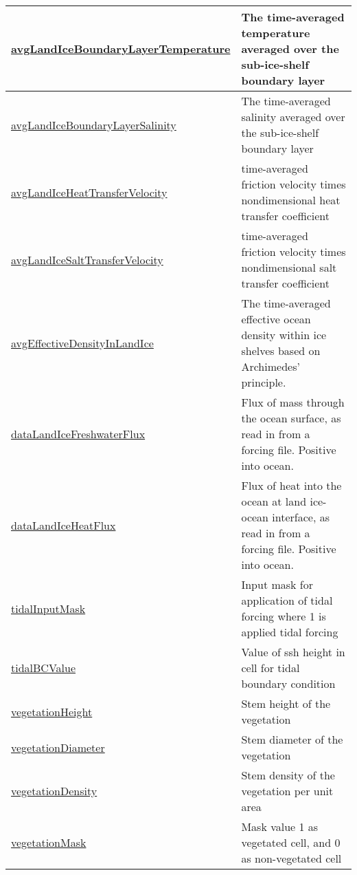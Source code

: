 {\begin{center}
\begin{longtable}{| p{2.0in} | p{4.0in} |}
    \hyperref[subsec:var_sec_forcing_avgLandIceBoundaryLayerTemperature]{avgLandIceBoundaryLayer\-Temperature} & The time-averaged temperature averaged over the sub-ice-shelf boundary layer \\
    \hline
    \hyperref[subsec:var_sec_forcing_avgLandIceBoundaryLayerSalinity]{avgLandIceBoundaryLayer\-Salinity} & The time-averaged salinity averaged over the sub-ice-shelf boundary layer \\
    \hline
    \hyperref[subsec:var_sec_forcing_avgLandIceHeatTransferVelocity]{avgLandIceHeatTransferVelocity} & time-averaged friction velocity times nondimensional heat transfer coefficient \\
    \hline
    \hyperref[subsec:var_sec_forcing_avgLandIceSaltTransferVelocity]{avgLandIceSaltTransferVelocity} & time-averaged friction velocity times nondimensional salt transfer coefficient \\
    \hline
    \hyperref[subsec:var_sec_forcing_avgEffectiveDensityInLandIce]{avgEffectiveDensityInLandIce} & The time-averaged effective ocean density within ice shelves based on Archimedes' principle. \\
    \hline
    \hyperref[subsec:var_sec_forcing_dataLandIceFreshwaterFlux]{dataLandIceFreshwaterFlux} & Flux of mass through the ocean surface, as read in from a forcing file. Positive into ocean. \\
    \hline
    \hyperref[subsec:var_sec_forcing_dataLandIceHeatFlux]{dataLandIceHeatFlux} & Flux of heat into the ocean at land ice-ocean interface, as read in from a forcing file. Positive into ocean. \\
    \hline
    \hyperref[subsec:var_sec_forcing_tidalInputMask]{tidalInputMask} & Input mask for application of tidal forcing where 1 is applied tidal forcing \\
    \hline
    \hyperref[subsec:var_sec_forcing_tidalBCValue]{tidalBCValue} & Value of ssh height in cell for tidal boundary condition \\
    \hline
    \hyperref[subsec:var_sec_forcing_vegetationHeight]{vegetationHeight} & Stem height of the vegetation \\
    \hline
    \hyperref[subsec:var_sec_forcing_vegetationDiameter]{vegetationDiameter} & Stem diameter of the vegetation \\
    \hline
    \hyperref[subsec:var_sec_forcing_vegetationDensity]{vegetationDensity} & Stem density of the vegetation per unit area \\
    \hline
    \hyperref[subsec:var_sec_forcing_vegetationMask]{vegetationMask} & Mask value 1 as vegetated cell, and 0 as non-vegetated cell \\

\end{longtable}
\end{center}}
